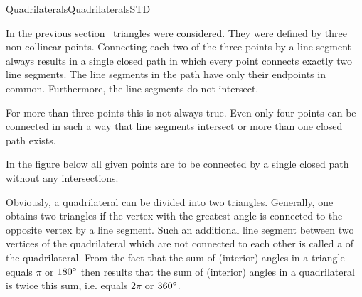 \begin{MXContent}{Quadrilaterals}{Quadrilaterals}{STD}

In the previous section~ triangles were considered.
They were defined by three non-collinear points. Connecting each two of the three points 
by a line segment always results in a single closed path in which
every point connects exactly two line segments. The line segments in the path
have only their endpoints in common. Furthermore, the line segments do not intersect. 

For more than three points this is not always true. Even only four points 
can be connected in such a way that line segments intersect or more than one
closed path exists.

In the figure below all given points are to be connected by a single closed path 
without any intersections.

\begin{center}
\end{center}

Obviously, a quadrilateral can be divided into two triangles. Generally, one 
obtains two triangles if the vertex with the greatest angle is connected to 
the opposite vertex by a line segment. Such an additional line segment between 
two vertices of the quadrilateral which are not connected to each other is called a 
 of the quadrilateral. From the fact that 
the sum of (interior) angles in a triangle equals $\pi$ or $180^{\circ}$ 
then results that the sum of (interior) angles in a quadrilateral is twice 
this sum, i.e. equals $2 \pi$ or $360^{\circ}$. 



\end{MXContent}
